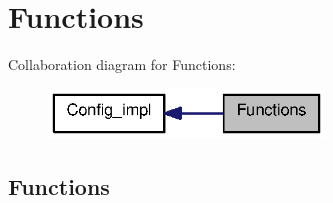 \section{Functions}
\label{group__functions}
Collaboration diagram for Functions:\nopagebreak
\begin{figure}[H]
\begin{center}
\leavevmode
\includegraphics[width=208pt]{group__functions}
\end{center}
\end{figure}
\subsection*{Functions}
